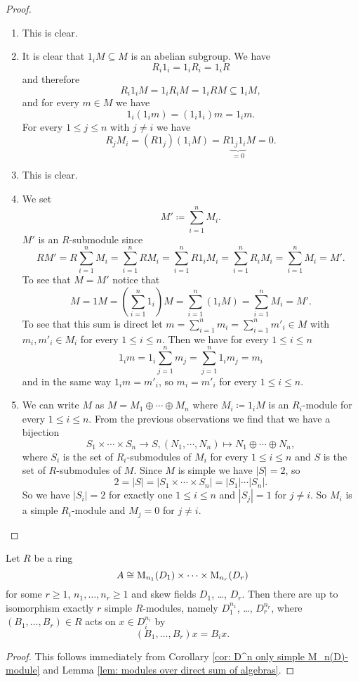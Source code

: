 \begin{proof}
 \begin{enumerate}[label=\emph{\alph*}),leftmargin=*]
  \item
   This is clear.
  \item
   It is clear that $1_i M \subseteq M$ is an abelian subgroup. We have
   \[
    R_i 1_i = 1_i R_i = 1_i R
   \]
   and therefore
   \[
    R_i 1_i M = 1_i R_i M = 1_i R M \subseteq 1_i M,
   \]
   and for every $m \in M$ we have
   \[
    1_i (1_i m) = (1_i 1_i) m = 1_i m.
   \]
   For every $1 \leq j \leq n$ with $j \neq i$ we have
   \[
    R_j M_i = (R 1_j) (1_i M) = R \underbrace{1_j 1_i}_{=0} M = 0.
   \]
  \item
   This is clear.
  \item
   We set
   \[
    M' \coloneqq \sum_{i=1}^n M_i.
   \]
   $M'$ is an $R$-submodule since
   \[
    R M'
    = R \sum_{i=1}^n M_i
    = \sum_{i=1}^n R M_i
    = \sum_{i=1}^n R 1_i M_i
    = \sum_{i=1}^n R_i M_i
    = \sum_{i=1}^n M_i
    = M'.
   \]
   To see that $M = M'$ notice that
   \[
    M
    = 1 M
    = \left( \sum_{i=1}^n 1_i \right) M
    = \sum_{i=1}^n (1_i M)
    = \sum_{i=1}^n M_i
    = M'.
   \]
   To see that this sum is direct let $m = \sum_{i=1}^n m_i = \sum_{i=1}^n m'_i \in M$ with $m_i, m'_i \in M_i$ for every $1 \leq i \leq n$. Then we have for every $1 \leq i \leq n$
   \[
    1_i m
    = 1_i \sum_{j=1}^n m_j
    = \sum_{j=1}^n 1_i m_j
    = m_i
   \]
   and in the same way $1_i m = m'_i$, so $m_i = m'_i$ for every $1 \leq i \leq n$.
  \item
   We can write $M$ as $M = M_1 \oplus \dotsb \oplus M_n$ where $M_i \coloneqq 1_i M$ is an $R_i$-module for every $1 \leq i \leq n$. From the previous observations we find that we have a bijection
   \[
    S_1 \times \dotsb \times S_n \to S, (N_1, \dotsb, N_n) \mapsto N_1 \oplus \dotsb \oplus N_n,
   \]
   where $S_i$ is the set of $R_i$-submodules of $M_i$ for every $1 \leq i \leq n$ and $S$ is the set of $R$-submodules of $M$. Since $M$ is simple we have $|S| = 2$, so
   \[
    2 = |S| = |S_1 \times \dotsb \times S_n| = |S_1| \dotsm |S_n|.
   \]
   So we have $|S_i| = 2$ for exactly one $1 \leq i \leq n$ and $|S_j| = 1$ for $j \neq i$. So $M_i$ is a simple $R_i$-module and $M_j = 0$ for $j \neq i$.
  \qedhere
 \end{enumerate}
\end{proof}


\begin{cor}\label{cor: simple modules over product of matrix algebras}
 Let $R$ be a ring
 \[
  A \cong \operatorname{M}_{n_1}(D_1) \times \dotsb \times \operatorname{M}_{n_r}(D_r)
 \]
 for some $r \geq 1$, $n_1, \dotsc, n_r \geq 1$ and skew fields $D_1$, \dots, $D_r$. Then there are up to isomorphism exactly $r$ simple $R$-modules, namely $D_1^{n_1}$, \dots, $D_r^{n_r}$, where $(B_1, \dotsc, B_r) \in R$ acts on $x \in D_i^{n_i}$ by
 \[
  (B_1, \dotsc, B_r) x =  B_i x.
 \]
\end{cor}
\begin{proof}
 This follows immediately from Corollary \ref{cor: D^n only simple M_n(D)-module} and Lemma \ref{lem: modules over direct sum of algebras}.
\end{proof}


